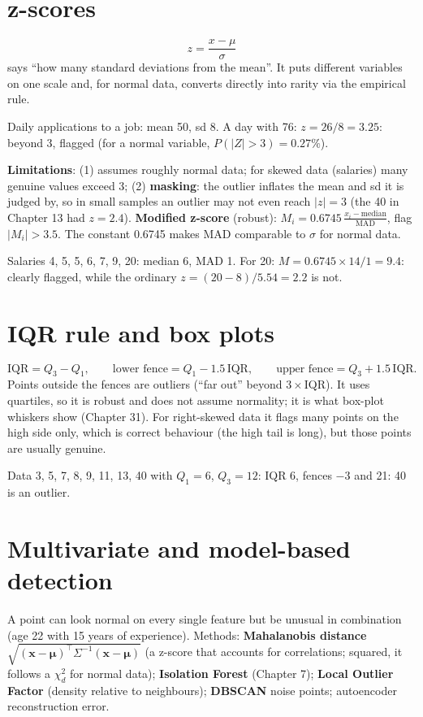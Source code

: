 \section{z-scores}
\[ z = \frac{x - \mu}{\sigma} \]
says ``how many standard deviations from the mean''. It puts different variables on one scale and, for normal data, converts directly into rarity via the empirical rule.
\begin{example}
Daily applications to a job: mean 50, sd 8. A day with 76: $z = 26/8 = 3.25$: beyond 3, flagged (for a normal variable, $P(|Z|>3) = 0.27\%$).
\end{example}
\textbf{Limitations}: (1) assumes roughly normal data; for skewed data (salaries) many genuine values exceed 3; (2) \textbf{masking}: the outlier inflates the mean and sd it is
judged by, so in small samples an outlier may not even reach $|z| = 3$ (the 40 in Chapter 13 had $z = 2.4$).
\textbf{Modified z-score} (robust): $M_i = 0.6745\,\frac{x_i - \text{median}}{\text{MAD}}$, flag $|M_i| > 3.5$. The constant 0.6745 makes MAD comparable to $\sigma$ for normal data.
\begin{example}[: modified z]
Salaries 4, 5, 5, 6, 7, 9, 20: median 6, MAD 1. For 20: $M = 0.6745\times14/1 = 9.4$: clearly flagged, while the ordinary $z = (20 - 8)/5.54 = 2.2$ is not.
\end{example}

\section{IQR rule and box plots}
\[ \text{IQR} = Q_3 - Q_1,\qquad \text{lower fence} = Q_1 - 1.5\,\text{IQR},\qquad \text{upper fence} = Q_3 + 1.5\,\text{IQR}. \]
Points outside the fences are outliers (``far out'' beyond $3\times$IQR). It uses quartiles, so it is robust and does not assume normality; it is what box-plot
whiskers show (Chapter 31). For right-skewed data it flags many points on the high side only, which is correct behaviour (the high tail is long), but those
points are usually genuine.
\begin{example}[: IQR]
Data 3, 5, 7, 8, 9, 11, 13, 40 with $Q_1 = 6$, $Q_3 = 12$: IQR 6, fences $-3$ and 21: 40 is an outlier.
\end{example}

\section{Multivariate and model-based detection}
A point can look normal on every single feature but be unusual in combination (age 22 with 15 years of experience). Methods:
\textbf{Mahalanobis distance} $\sqrt{(\mathbf x - \boldsymbol\mu)^\top\Sigma^{-1}(\mathbf x - \boldsymbol\mu)}$ (a z-score that accounts for correlations; squared, it follows a
$\chi^2_d$ for normal data); \textbf{Isolation Forest} (Chapter 7); \textbf{Local Outlier Factor} (density relative to neighbours); \textbf{DBSCAN} noise points;
autoencoder reconstruction error.

